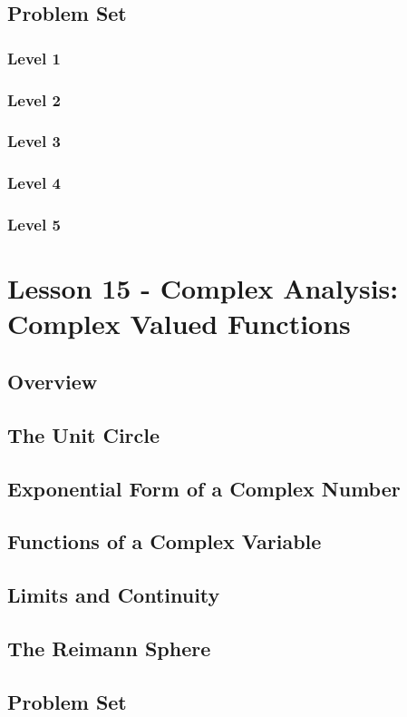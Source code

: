 \documentclass{article}
\begin{document}
\subsection{Problem Set}
\subsubsection{Level 1}
\subsubsection{Level 2}
\subsubsection{Level 3}
\subsubsection{Level 4}
\subsubsection{Level 5}
\pagebreak

\section{Lesson 15 - Complex Analysis: Complex Valued Functions}
\subsection{Overview}
\subsection{The Unit Circle}
\subsection{Exponential Form of a Complex Number}
\subsection{Functions of a Complex Variable}
\subsection{Limits and Continuity}
\subsection{The Reimann Sphere}
\subsection{Problem Set}
\end{document}
